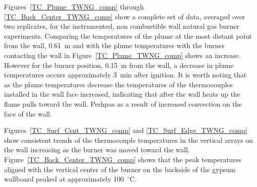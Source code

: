 \documentclass[twoside]{uocthesis}
\begin{document}
{Figures~\ref{TC_Plume_TWNG_comp} through \ref{TC_Back_Center_TWNG_comp} show a complete set of data, averaged over two replicates, for the instrumented, non combustible wall natural gas burner experiments.  Comparing the temperatures of the plume at the most distant point from the wall, 0.61~m and with the plume temperatures with the burner contacting the wall in Figure~\ref{TC_Plume_TWNG_comp} shows an increase.  However for the burner position, 0.15~m from the wall, a decrease in plume temperatures occurs approximately 3~min after ignition.  It is worth noting that as the plume temperatures decrease the temperatures of the thermocouples installed in the wall face increased, indicating that after the wall heats up the flame pulls toward the wall.  Perhpas as a result of increased convection on the face of the wall. 

Figures~\ref{TC_Surf_Cent_TWNG_comp} and \ref{TC_Surf_Edge_TWNG_comp} show consistent trends of the thermocouple temperatures in the vertical arrays on the wall increasing as the burner was moved toward the wall.  Figure~\ref{TC_Back_Center_TWNG_comp} shows that the peak temperatures aligned with the vertical center of the burner on the backside of the gypsum wallboard peaked at approximately 100~$^\circ$C.


}
\end{document}
